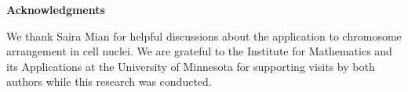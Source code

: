 \documentclass{siamltex}
\begin{document}
\vspace{0.5cm}

{\bf Acknowledgments} 

We thank Saira Mian for helpful discussions about the application to
chromosome arrangement in cell nuclei. We are grateful to the
Institute for Mathematics and its Applications at the University of
Minnesota for supporting visits by both authors while this research
was conducted.

 

\end{document}
